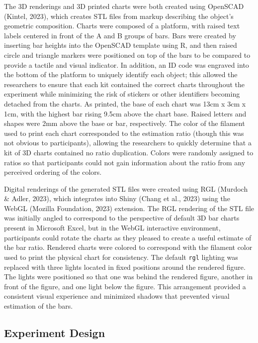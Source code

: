 \documentclass[phd]{nuthesis}
\begin{document}
The 3D renderings and 3D printed charts were both created using OpenSCAD
(Kintel, 2023), which creates STL files from markup describing the
object's geometric composition. Charts were composed of a platform, with
raised text labels centered in front of the A and B groups of bars. Bars
were created by inserting bar heights into the OpenSCAD template using
R, and then raised circle and triangle markers were positioned on top of
the bars to be compared to provide a tactile and visual indicator. In
addition, an ID code was engraved into the bottom of the platform to
uniquely identify each object; this allowed the researchers to ensure
that each kit contained the correct charts throughout the experiment
while minimizing the risk of stickers or other identifiers becoming
detached from the charts. As printed, the base of each chart was 13cm x
3cm x 1cm, with the highest bar rising 9.5cm above the chart base.
Raised letters and shapes were 2mm above the base or bar, respectively.
The color of the filament used to print each chart corresponded to the
estimation ratio (though this was not obvious to participants), allowing
the researchers to quickly determine that a kit of 3D charts contained
no ratio duplication. Colors were randomly assigned to ratios so that
participants could not gain information about the ratio from any
perceived ordering of the colors.

Digital renderings of the generated STL files were created using RGL
(Murdoch \& Adler, 2023), which integrates into Shiny (Chang et al.,
2023) using the WebGL (Mozilla Foundation, 2023) extension. The RGL
rendering of the STL file was initially angled to correspond to the
perspective of default 3D bar charts present in Microsoft Excel, but in
the WebGL interactive environment, participants could rotate the charts
as they pleased to create a useful estimate of the bar ratio. Rendered
charts were colored to correspond with the filament color used to print
the physical chart for consistency. The default \texttt{rgl} lighting
was replaced with three lights located in fixed positions around the
rendered figure. The lights were positioned so that one was behind the
rendered figure, another in front of the figure, and one light below the
figure. This arrangement provided a consistent visual experience and
minimized shadows that prevented visual estimation of the bars.

\subsection{Experiment Design}\label{experiment-design}
\end{document}
